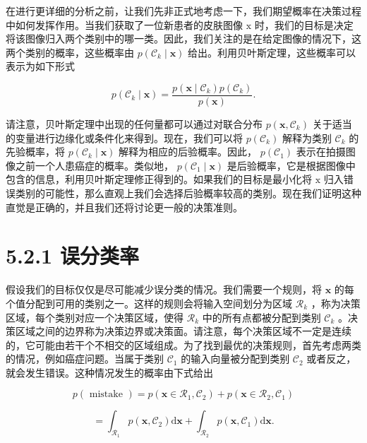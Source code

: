 \documentclass[10pt]{report}
\begin{document}
在进行更详细的分析之前，让我们先非正式地考虑一下，我们期望概率在决策过程中如何发挥作用。当我们获取了一位新患者的皮肤图像 \(\mathrm{x}\) 时，我们的目标是决定将该图像归入两个类别中的哪一类。因此，我们关注的是在给定图像的情况下，这两个类别的概率，这些概率由 \(p\left( {{\mathcal{C}}_{k} \mid  \mathbf{x}}\right)\) 给出。利用贝叶斯定理，这些概率可以表示为如下形式

\[
p\left( {{\mathcal{C}}_{k} \mid  \mathbf{x}}\right)  = \frac{p\left( {\mathbf{x} \mid  {\mathcal{C}}_{k}}\right) p\left( {\mathcal{C}}_{k}\right) }{p\left( \mathbf{x}\right) }. \tag{5.19}
\]

请注意，贝叶斯定理中出现的任何量都可以通过对联合分布 \(p\left( {\mathbf{x},{\mathcal{C}}_{k}}\right)\) 关于适当的变量进行边缘化或条件化来得到。现在，我们可以将 \(p\left( {\mathcal{C}}_{k}\right)\) 解释为类别 \({\mathcal{C}}_{k}\) 的先验概率，将 \(p\left( {{\mathcal{C}}_{k} \mid  \mathbf{x}}\right)\) 解释为相应的后验概率。因此， \(p\left( {\mathcal{C}}_{1}\right)\) 表示在拍摄图像之前一个人患癌症的概率。类似地， \(p\left( {{\mathcal{C}}_{1} \mid  \mathbf{x}}\right)\) 是后验概率，它是根据图像中包含的信息，利用贝叶斯定理修正得到的。如果我们的目标是最小化将 \(\mathrm{x}\) 归入错误类别的可能性，那么直观上我们会选择后验概率较高的类别。现在我们证明这种直觉是正确的，并且我们还将讨论更一般的决策准则。

\section*{5.2.1 误分类率}

假设我们的目标仅仅是尽可能减少误分类的情况。我们需要一个规则，将 \(\mathbf{x}\) 的每个值分配到可用的类别之一。这样的规则会将输入空间划分为区域 \({\mathcal{R}}_{k}\) ，称为决策区域，每个类别对应一个决策区域，使得 \({\mathcal{R}}_{k}\) 中的所有点都被分配到类别 \({\mathcal{C}}_{k}\) 。决策区域之间的边界称为决策边界或决策面。请注意，每个决策区域不一定是连续的，它可能由若干个不相交的区域组成。为了找到最优的决策规则，首先考虑两类的情况，例如癌症问题。当属于类别 \({\mathcal{C}}_{1}\) 的输入向量被分配到类别 \({\mathcal{C}}_{2}\) 或者反之，就会发生错误。这种情况发生的概率由下式给出

\[
p\left( \text{ mistake }\right)  = p\left( {\mathbf{x} \in  {\mathcal{R}}_{1},{\mathcal{C}}_{2}}\right)  + p\left( {\mathbf{x} \in  {\mathcal{R}}_{2},{\mathcal{C}}_{1}}\right)
\]

\[
= {\int }_{{\mathcal{R}}_{1}}p\left( {\mathbf{x},{\mathcal{C}}_{2}}\right) \mathrm{d}\mathbf{x} + {\int }_{{\mathcal{R}}_{2}}p\left( {\mathbf{x},{\mathcal{C}}_{1}}\right) \mathrm{d}\mathbf{x}. \tag{5.20}
\]
\end{document}
